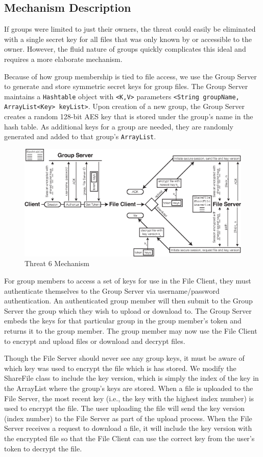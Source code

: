 \documentclass[11pt]{article}
\begin{document}
\subsection{Mechanism Description}
If groups were limited to just their owners, the threat could easily be eliminated with a single secret key for all files that was only known by or accessible to the owner. However, the fluid nature of groups quickly complicates this ideal and requires a more elaborate mechanism.

Because of how group membership is tied to file access, we use the Group Server to generate and store symmetric secret keys for group files. The Group Server maintains a \texttt{Hashtable} object with \texttt{<K,V>} parameters \texttt{<String groupName, ArrayList<Key> keyList>}. Upon creation of a new group, the Group Server creates a random 128-bit AES key that is stored under the group's name in the hash table. As additional keys for a group are needed, they are randomly generated and added to that group's \texttt{ArrayList}.
\begin{figure}[htbp]
\begin{center}
\includegraphics{threat6.eps}
\caption{Threat 6 Mechanism}
\label{threat6}
\end{center}
\end{figure}

For group members to access a set of keys for use in the File Client, they must authenticate themselves to the Group Server via username/password authentication. An authenticated group member will then submit to the Group Server the group which they wish to upload or download to. The Group Server embeds the keys for that particular group in the group member's token and returns it to the group member. The group member may now use the File Client to encrypt and upload files or download and decrypt files.

Though the File Server should never see any group keys, it must be aware of which key was used to encrypt the file which is has stored. We modify the \textsf{ShareFile} class to include the key version, which is simply the index of the key in the \textsf{ArrayList} where the group's keys are stored. When a file is uploaded to the File Server, the most recent key (i.e., the key with the highest index number) is used to encrypt the file. The user uploading the file will send the key version (index number) to the File Server as part of the upload process. When the File Server receives a request to download a file, it will include the key version with the encrypted file so that the File Client can use the correct key from the user's token to decrypt the file.
\end{document}
